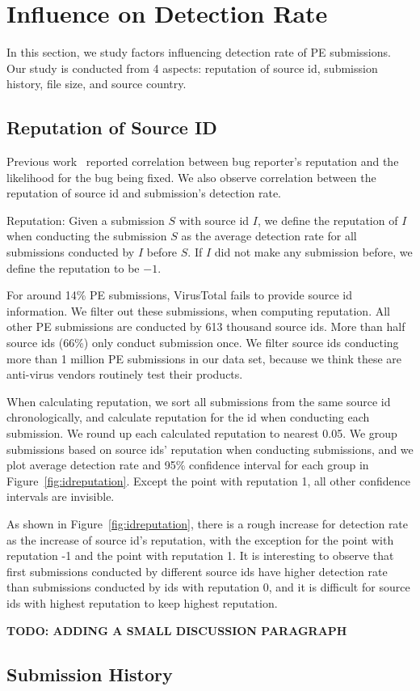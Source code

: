 \section{Influence on Detection Rate}
\label{sec:corr}
In this section, we study factors influencing detection rate of PE submissions. 
Our study is conducted from 4 aspects: reputation of source id, submission history, 
file size, and source country.

\subsection{Reputation of Source ID}



Previous work~\cite{GuoICSE2010} reported correlation between bug reporter’s reputation and the likelihood for the bug being fixed. 
We also observe correlation between the reputation of source id and submission’s detection rate. 

\begin{definition}{Reputation:}
Given a submission $S$ with source id $I$, 
we define the reputation of $I$ when conducting the submission $S$ as the average detection rate for all submissions conducted by $I$ before $S$. 
If $I$ did not make any submission before, we define the reputation to be $-1$. 
\end{definition}

For around 14\% PE submissions, VirusTotal fails to provide source id information. 
We filter out these submissions, when computing reputation.
All other PE submissions are conducted by 613 thousand source ids. 
More than half source ids (66\%) only conduct submission once. 
We filter source ids conducting more than 1 million PE submissions in our data set, 
because we think these are anti-virus vendors routinely test their products. 

When calculating reputation, we sort all submissions from the same source id chronologically, 
and calculate reputation for the id when conducting each submission. 
We round up each calculated reputation to nearest 0.05. 
We group submissions based on source ids' reputation when conducting submissions, 
and we plot average detection rate and 95\% confidence interval for each group in Figure~\ref{fig:idreputation}. 
Except the point with reputation 1, all other confidence intervals are invisible.  

As shown in Figure~\ref{fig:idreputation}, 
there is a rough increase for detection rate as the increase of source id's reputation, 
with the exception for the point with reputation -1 and the point with reputation 1. 
It is interesting to observe that first submissions conducted by different source ids have higher 
detection rate than submissions conducted by ids with reputation 0, 
and it is difficult for source ids with highest reputation to keep highest reputation.  

{\bf TODO: ADDING A SMALL DISCUSSION PARAGRAPH}

\subsection{Submission History}